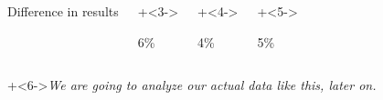 \begin{frame}
{\begin{columns}[T]
			\centerline{{\color{myOrange}Difference in results}}
			
			\vspace{12pt}
			\begin{description}
			  \onslide+<3->{\item[Batch $1 - 2$:\quad] 6\%}
			\end{description}
			
			\vspace{0pt}
			\begin{description}
			  \onslide+<4->{\item[Batch $3 - 4$:\quad] 4\%}
			\end{description}
			
			\vspace{0pt}
			\begin{description}
			 \onslide+<5->{ \item[Batch $5 - 6$:\quad] 5\%}
			\end{description}

	\end{columns}
	}
	
	\vspace{15pt}
	\onslide+<6->{\emph{\color{myGreen}We are going to analyze our actual data like this, later on.}}
\end{frame}

